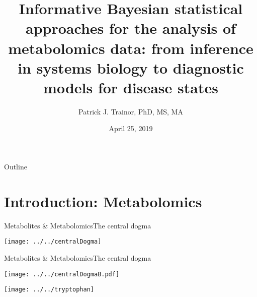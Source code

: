 \documentclass[xcolor=dvipsnames]{beamer}
\begin{document}
	
\title[Bayesian Approaches in Metabolomics]{{\bf Informative Bayesian statistical approaches for the analysis of metabolomics data: from inference in systems biology to diagnostic models for disease states}}
\author[P.J. Trainor]{Patrick J. Trainor, PhD, MS, MA}
\date[April 2019]{April 25, 2019}

\begin{frame}
	\titlepage
\end{frame}

\begin{frame}{Outline}
\vspace{-10.5pt}
\tableofcontents[hideallsubsections]
\end{frame}

\section{Introduction: Metabolomics}

\begin{frame}{Metabolites \& Metabolomics}{The central dogma}
\vspace{-7 pt}
\begin{center}
		\texttt{[image: ../../centralDogma]}
	\end{center}
\end{frame}

\begin{frame}{Metabolites \& Metabolomics}{The central dogma}
\vspace{-7 pt}
\begin{center}
	\texttt{[image: ../../centralDogmaB.pdf]}
\end{center}
\addtocounter{framenumber}{-1}
\end{frame}

\begin{frame}
	\vspace{-10.5pt}
	\begin{center}
		\texttt{[image: ../../tryptophan]}
		
	\end{center}
\end{frame}
\end{document}
